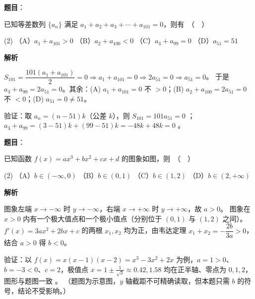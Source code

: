 \begin{answer}

\textbf{题目}：

已知等差数列 $\{a_n\}$ 满足 $a_1 + a_2 + a_3 + \cdots + a_{101} = 0$，则有　（　）

\begin{gkopts}(2)
\task （A）$a_1 + a_{101} > 0$
\task （B）$a_2 + a_{100} < 0$
\task （C）$a_3 + a_{99} = 0$
\task （D）$a_{51} = 51$
\end{gkopts}

\textbf{解析}

$S_{101}=\dfrac{101(a_1+a_{101})}{2}=0\Rightarrow a_1+a_{101}=0\Rightarrow 2a_{51}=0\Rightarrow a_{51}=0$。
于是 $a_3+a_{99}=2a_{51}=0$。其余：(A) $a_1+a_{101}=0$ 不 $>0$；(B) $a_2+a_{100}=2a_{51}=0$ 不 $<0$；(D) $a_{51}=0\ne51$。

验证：取 $a_n=(n-51)k$（公差 $k$），则 $S_{101}=101a_{51}=0$ ；$a_3+a_{99}=(3-51)k+(99-51)k=-48k+48k=0$ 。


\end{answer}
\begin{answer}

\textbf{题目}：

已知函数 $f(x) = ax^3 + bx^2 + cx + d$ 的图象如图，则　（　）
\nopagebreak[4]
\begin{center}\end{center}
\nopagebreak[4]
\begin{gkopts}(2)
\task （A）$b \in (-\infty, 0)$
\task （B）$b \in (0, 1)$
\task （C）$b \in (1, 2)$
\task （D）$b \in (2, +\infty)$
\end{gkopts}

\textbf{解析}

图象左端 $x\to-\infty$ 时 $y\to-\infty$，右端 $x\to+\infty$ 时 $y\to+\infty$，故 $a>0$。
图象在 $x>0$ 内有一个极大值点和一个极小值点（分别位于 $(0,1)$ 与 $(1,2)$ 之间）。$f'(x)=3ax^2+2bx+c$ 的两根 $x_1,x_2$ 均为正，由韦达定理 $x_1+x_2=-\dfrac{2b}{3a}>0$，结合 $a>0$ 得 $b<0$。

验证：以 $f(x)=x(x-1)(x-2)=x^3-3x^2+2x$ 为例，$a=1>0$、$b=-3<0$、$c=2$，极值点 $x=1\pm\frac{1}{\sqrt3}\approx0.42,1.58$ 均在正半轴、零点为 $0,1,2$，图形与题图一致 。
（题图为示意图，$y$ 轴截距不可精确读取，但本题只需 $b$ 的符号，结论不受影响。）


\end{answer}
